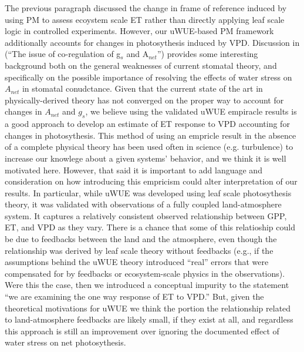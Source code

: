 \documentclass[12pt]{article}
\begin{document}
The previous paragraph discussed the change in frame of reference
induced by using PM to assess ecoystem scale ET rather than directly
applying leaf scale logic in controlled experiments. However, our
uWUE-based PM framework additionally accounts for changes in
photosythesis induced by VPD. Discussion in \cite{Damour2010} (``The
issue of co-regulation of g$_s$ and A$_{net}$'') provides some
interesting background both on the general weaknesses of current
stomatal theory, and specifically on the possible importance of resolving the
effects of water stress on $A_{net}$ in stomatal conudctance. Given
that the current state of the art in physically-derived theory has not
converged on the proper way to account for changes in $A_{net}$ and
$g_s$, we believe using the validated uWUE empiracle results
\citep[e.g. Figure 3]{Zhou_2014} is a good approach to develop an
estimate of ET response to VPD accounting for changes in
photosythesis. This method of using an empricle result in the absence
of a complete physical theory has been used often in science
(e.g. turbulence) to increase our knowlege about a given systems'
behavior, and we think it is well motivated here. However, that said
it is important to add language and consideration on how introducing
this empricism could alter interpretation of our results. In
particular, while uWUE was developed using leaf scale photosythesis
theory, it was validated with observations of a fully coupled
land-atmosphere system. It captures a relatively consistent observed
relationship between GPP, ET, and VPD as they vary. There is a chance
that some of this relatioship could be due to feedbacks between the
land and the atmosphere, even though the relationship was derived by
leaf scale theory without feedbacks (e.g., if the assumptions behind
the uWUE theory introduced ``real'' errors that were compensated for
by feedbacks or ecosystem-scale physics in the observations).  Were
this the case, then we introduced a conceptual impurity to the
statement ``we are examining the one way response of ET to VPD.''
But, given the theoretical motivations for uWUE we think the portion
the relationship related to land-atmosphere feedbacks are likely
small, if they exist at all, and regardless this approach is still an
improvement over ignoring the documented effect of water stress on net
photosythesis.
\end{document}
